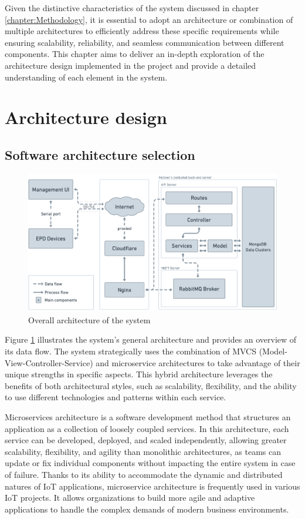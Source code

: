 \documentclass[../Main.tex]{subfiles}
\begin{document}
Given the distinctive characteristics of the system discussed in chapter \ref{chapter:Methodology}, it is essential to adopt an architecture or combination of multiple architectures to efficiently address these specific requirements while ensuring scalability, reliability, and seamless communication between different components. This chapter aims to deliver an in-depth exploration of the architecture design implemented in the project and provide a detailed understanding of each element in the system.
\section{Architecture design}
\subsection{Software architecture selection}
\begin{figure}[H]
    \centering
    \includegraphics[scale=0.46]{doc/imgs/overall-architecture.png}
    \caption{Overall architecture of the system}
    \label{fig:Fig1}
\end{figure}

Figure \ref{fig:Fig1} illustrates the system's general architecture and provides an overview of its data flow. The system strategically uses the combination of MVCS (Model-View-Controller-Service) and microservice architectures to take advantage of their unique strengths in specific aspects. This hybrid architecture leverages the benefits of both architectural styles, such as scalability, flexibility, and the ability to use different technologies and patterns within each service.

Microservices architecture is a software development method that structures an application as a collection of loosely coupled services. In this architecture, each service can be developed, deployed, and scaled independently, allowing greater scalability, flexibility, and agility than monolithic architectures, as teams can update or fix individual components without impacting the entire system in case of failure. Thanks to its ability to accommodate the dynamic and distributed natures of IoT applications, microservice architecture is frequently used in various IoT projects. It allows organizations to build more agile and adaptive applications to handle the complex demands of modern business environments.
\end{document}

